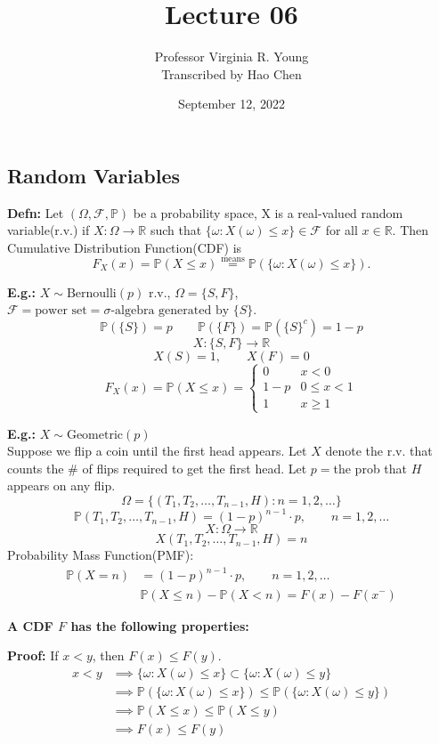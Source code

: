 \documentclass[a4paper]{article}
\title{Lecture 06}
\author{Professor Virginia R. Young\\ \small{Transcribed by Hao Chen}}
\date{September 12, 2022}
\newcommand{\n}{\hfill\break}
\newcommand{\defn}[1]{\par\noindent\settowidth{\hangindent}{\textbf{Defn: }}\textbf{Defn: }#1\n}
\newcommand{\eg}[1]{\par\noindent\settowidth{\hangindent}{\textbf{E.g.: }}\textbf{E.g.: }#1\n}
\newcommand{\pf}[1]{\par\noindent\settowidth{\hangindent}{\textbf{Proof: }}\textbf{Proof: }#1\n}
\newcommand{\reals}{\mathbb{R}}
\newcommand{\R}{\reals}
\newcommand{\F}{\mathcal F}
\newcommand{\Prob}{\mathbb{P}}
\renewcommand{\P}{\Prob}
\begin{document}
\maketitle

\subsection*{Random Variables}

\defn{Let $(\Omega, \F, \P)$  be a probability space, X is a real-valued random variable(r.v.) if $X:\Omega\rightarrow\R$ such that $\{\omega:X(\omega)\leq x\}\in\F$ for all $x\in\R$. Then Cumulative Distribution Function(CDF) is \[F_X(x)=\P(X\leq x)\overset{\text{means}}=\P(\{\omega:X(\omega)\leq x\}).\] %
}

\eg{$X\sim\text{Bernoulli}(p)$ r.v., $\Omega=\{S, F\}$, $\F=\text{power set}=\sigma\text{-algebra generated by }\{S\}$.
\[\P(\{S\})=p\qquad\P(\{F\})=\P(\{S\}^c)=1-p\]
\[X:\{S, F\}\rightarrow\R\]
\[X(S)=1,\qquad X(F)=0\]
\[F_X(x)=\P(X\leq x)=\left\{\begin{array}{lc}0&x<0\\1-p&0\leq x<1\\1&x\geq1\end{array}\right.\]
}


\eg{$X\sim\text{Geometric}(p)$ \\
Suppose we flip a coin until the first head appears. Let $X$ denote the r.v. that counts the \# of flips required to get the first head. Let $p=$the prob that $H$ appears on any flip. 
\[\Omega=\{(T_1, T_2, \dots, T_{n-1}, H):n=1, 2, \dots\}\]
\[\P(T_1, T_2, \dots, T_{n-1}, H)=(1-p)^{n-1}\cdot p,\qquad n=1, 2, \dots\]
\[X:\Omega\rightarrow\R\]
\[X(T_1, T_2, \dots, T_{n-1}, H)=n\]
Probability Mass Function(PMF):
\begin{align*}
    \P(X=n)&=(1-p)^{n-1}\cdot p,\qquad n=1,2,\dots \\
    &\P(X\leq n)-\P(X<n)=F(x)-F(x^-)
\end{align*}
}

\textbf{A CDF $F$ has the following properties:}
\pf{ If $x<y$, then $F(x)\leq F(y)$.
\begin{align*}
    x<y&\implies\{\omega:X(\omega)\leq x\}\subset\{\omega:X(\omega)\leq y\} \\
    &\implies \P(\{\omega:X(\omega)\leq x\})\leq\P(\{\omega:X(\omega)\leq y\}) \\
    &\implies \P(X\leq x)\leq\P(X\leq y) \\
    &\implies F(x)\leq F(y)
\end{align*}
}
\end{document}
